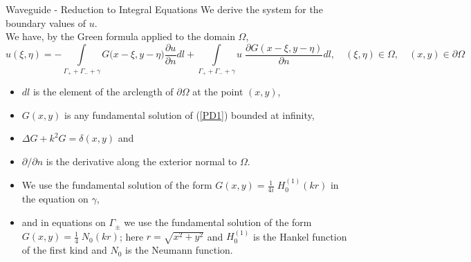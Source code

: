 \documentclass{beamer}
\newcommand{\ds}{\displaystyle}
\begin{document}
\begin{frame}{Waveguide - Reduction to Integral Equations}
We derive the system  for the boundary values of $u$. \\We have, by the Green formula applied to the domain $\Omega$, 
\begin{equation}\label{GF}
u(\xi,\eta)=-\ds\int\limits_{\Gamma_{+}+\Gamma_{-}+\gamma} G\Big(x-\xi,y-\eta\Big)\ds\frac{\partial u}{\partial n} dl+\ds\int\limits_{\Gamma_{+}+\Gamma_{-}+\gamma} u\;\ds\frac{\partial G(x-\xi,y-\eta)}{\partial n} dl,\quad(\xi,\eta)\in\Omega,\quad(x,y)\in\partial\Omega
\end{equation}

\begin{itemize}
\item $dl$ is the element of the arclength of $\partial\Omega$ at the point $(x,y)$, 
\item $G(x,y)$ is any fundamental solution of (\ref{PD1}) bounded at infinity,
\item  $\Delta G+k^2 G=\delta(x,y)$ and 
\item $\partial/\partial n$ is the derivative along the exterior normal to $\Omega$.
\end{itemize}
\end{frame}

\begin{frame}
 \begin{itemize}
\item We use the fundamental solution of the form $G(x,y)=\ds\frac{1}{4i}\;H_{0}^{(1)}(k r)$ in the equation on $\gamma$, 
\item and in equations on $\Gamma_\pm$  we use the fundamental solution of the form  $G(x,y)=\ds\frac{1}{4}\;N_{0}(k r)$; here $r=\sqrt{x^2+y^2}$ and $H_0^{(1)}$ is the Hankel function of the first kind and $N_0$ is the Neumann function.
\end{itemize}
\end{frame}
\end{document}
